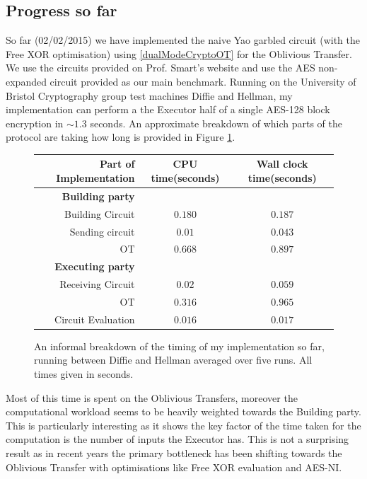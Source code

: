 \documentclass[a4paper,10pt]{article}
\begin{document}
		\subsection{Progress so far}
			So far (02/02/2015) we have implemented the naive Yao garbled circuit (with the Free XOR optimisation) using \ref{dualModeCryptoOT} for the Oblivious Transfer. We use the circuits provided on Prof. Smart's website \cite{NigelCircuits} and use the AES non-expanded circuit provided as our main benchmark. Running on the University of Bristol Cryptography group test machines Diffie and Hellman, my implementation can perform a the Executor half of a single AES-128 block encryption in $\sim 1.3$ seconds. An approximate breakdown of which parts of the protocol are taking how long is provided in Figure \ref{fig:TimesBreakdown}.\\


	
			\begin{figure}[h!]
				\centering
				\begin{tabular}[!htb]{r | c | c}
					\textbf{Part of Implementation} & \textbf{CPU time(seconds)} & \textbf{Wall clock time(seconds)}\\
					\hline
					\textbf{Building party} & & \\
					Building Circuit & $0.180$ & $0.187$\\
					Sending circuit & $0.01$ & $0.043$\\
					OT &  $0.668$ & $0.897$\\

					\hline
					\textbf{Executing party} & & \\
					Receiving Circuit &  $0.02$ &  $0.059$\\
					OT & $0.316$ & $0.965$ \\
 					Circuit Evaluation & $0.016$ & $0.017$\\


				\end{tabular}
				\caption{An informal breakdown of the timing of my implementation so far, running between Diffie and Hellman averaged over five runs. All times given in seconds. \label{fig:TimesBreakdown}}
			\end{figure}

			Most of this time is spent on the Oblivious Transfers, moreover the computational workload seems to be heavily weighted towards the Building party. This is particularly interesting as it shows the key factor of the time taken for the computation is the number of inputs the Executor has. This is not a surprising result as in recent years the primary bottleneck has been shifting towards the Oblivious Transfer with optimisations like Free XOR evaluation and AES-NI.\\
\end{document}
